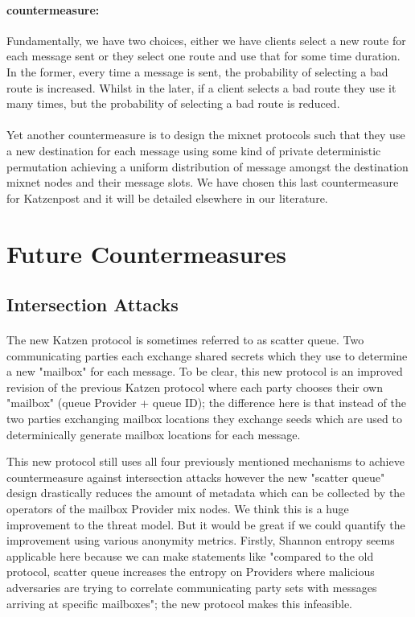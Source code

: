 \documentclass{article}
\begin{document}
\paragraph{countermeasure:} Fundamentally, we have two choices, either we have clients select a new route for each message sent or they select one route and use that for some time duration. In the former, every time a message is sent, the probability of selecting a bad route is increased. Whilst in the later, if a client selects a bad route they use it many times, but the probability of selecting a bad route is reduced.
\paragraph{}Yet another countermeasure is to design the mixnet protocols such that they use a new destination for each message using some kind of private deterministic permutation achieving a uniform distribution of message amongst the destination mixnet nodes and their message slots. We have chosen this last countermeasure  for Katzenpost and it will be detailed elsewhere in our literature.



\section{Future Countermeasures}

\subsection{Intersection Attacks}

\paragraph{}The new Katzen protocol is sometimes referred to as scatter queue.
Two communicating parties each exchange shared secrets which they use to determine
a new "mailbox" for each message. To be clear, this new protocol is an improved revision of the previous Katzen protocol where
each party chooses their own "mailbox" (queue Provider + queue ID); the difference here is
that instead of the two parties exchanging mailbox locations they exchange seeds which are
used to determinically generate mailbox locations for each message.

This new protocol still uses all four previously mentioned mechanisms to achieve countermeasure against intersection attacks
however the new "scatter queue" design drastically reduces the amount of metadata which can be collected by the operators
of the mailbox Provider mix nodes. We think this is a huge improvement to the threat model. But it would be great if we could
quantify the improvement using various anonymity metrics. Firstly, Shannon entropy seems applicable here because we can make
statements like "compared to the old protocol, scatter queue increases the entropy on Providers where malicious adversaries are
trying to correlate communicating party sets with messages arriving at specific mailboxes"; the new protocol makes this infeasible. 
\end{document}
